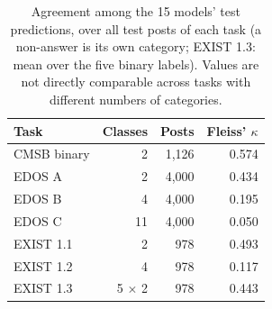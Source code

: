 \begin{table}[t]
\centering
\small
\caption{Agreement among the 15 models' test predictions, over all test posts of each task (a non-answer is its own category; EXIST 1.3: mean over the five binary labels). Values are not directly comparable across tasks with different numbers of categories.}
\label{tab:agreement}
\begin{tabular}{lrrr}
\toprule
Task & Classes & Posts & Fleiss' $\kappa$ \\
\midrule
CMSB binary & 2 & 1{,}126 & 0.574 \\
EDOS A & 2 & 4{,}000 & 0.434 \\
EDOS B & 4 & 4{,}000 & 0.195 \\
EDOS C & 11 & 4{,}000 & 0.050 \\
EXIST 1.1 & 2 & 978 & 0.493 \\
EXIST 1.2 & 4 & 978 & 0.117 \\
EXIST 1.3 & 5 $\times$ 2 & 978 & 0.443 \\
\bottomrule
\end{tabular}
\end{table}
